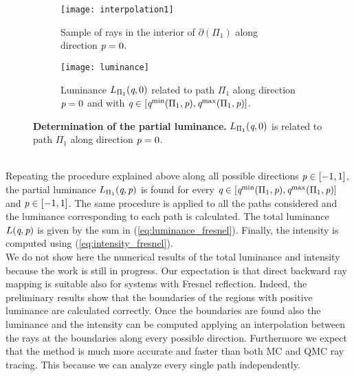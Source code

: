 \begin{figure}[t]
\centering
\begin{subfigure}{.45\textwidth}
  \texttt{[image: interpolation1]}
 \caption{Sample of rays in the interior of $\partial$$(\Pi_1)$ along direction $\textit{p}=0$.}
  \label{fig:interpolation1}
\end{subfigure}%
\hfill
\begin{subfigure}{.45\textwidth}
  \texttt{[image: luminance]}
  \caption{Luminance $L_{\Pi_1}(\textit{q}, 0)$ related to path $\Pi_1$ along direction $\textit{p}=0$ and with $\textit{q}\in[\textit{q}^{\textrm{min}}(\Pi_1, \textit{p}), \textit{q}^{\textrm{max}}(\Pi_1, \textit{p})]$.} %
  \label{fig:luminance_fresnel}
\end{subfigure} %
\caption{\textbf{Determination of the partial luminance.} $L_{\Pi_1}(\textit{q}, 0)$ is related to path $\Pi_1$ along direction $\textit{p}=0$.} 
\end{figure}
\\\indent 
Repeating the procedure explained above along all possible directions $\textit{p}\in[-1,1]$, the partial luminance $L_{\Pi_1}(\textit{q}, \textit{p})$ is found for every $\textit{q}\in[\textit{q}^{\textrm{min}}(\Pi_1,\textit{p}), \textit{q}^{\textrm{max}}(\Pi_1,\textit{p})]$ and $\textit{p}\in[-1,1]$. The same procedure is applied to all the paths considered and the luminance corresponding to each path is calculated. The total luminance $L(\textit{q}, \textit{p})$ is given by the sum in (\ref{eq:luminance_fresnel}). Finally, the intensity is computed using (\ref{eq:intensity_fresnel}). \\ \indent
We do not show here the numerical results of the total luminance and intensity because the work is still in progress. Our expectation is that direct backward ray mapping is suitable also for systems with Fresnel reflection. Indeed, the preliminary results show that the boundaries of the regions with positive luminance are calculated correctly. Once the boundaries are found also the luminance and the intensity can be computed applying an interpolation between the rays at the boundaries along every possible direction. Furthermore we expect that the method is much more accurate and faster than both MC and QMC ray tracing. This because we can analyze every single path independently.  
